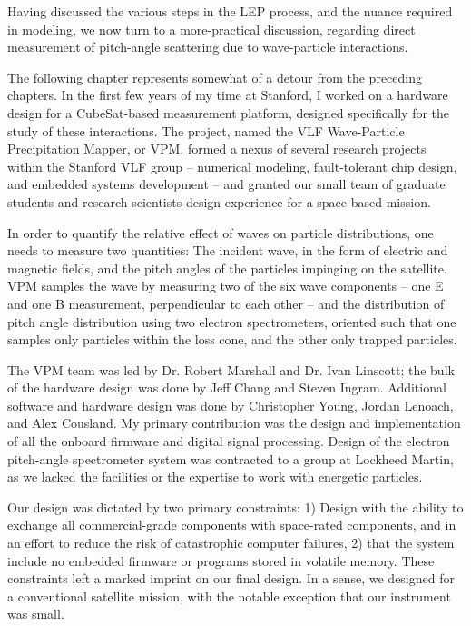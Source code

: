 Having discussed the various steps in the LEP process, and the nuance required in modeling, we now turn to a more-practical discussion, regarding direct measurement of pitch-angle scattering due to wave-particle interactions. 

The following chapter represents somewhat of a detour from the preceding chapters. In the first few years of my time at Stanford, I worked on a hardware design for a CubeSat-based measurement platform, designed specifically for the study of these interactions. The project, named the VLF Wave-Particle Precipitation Mapper, or VPM, formed a nexus of several research projects within the Stanford VLF group -- numerical modeling, fault-tolerant chip design, and embedded systems development -- and granted our small team of graduate students and research scientists design experience for a space-based mission.

In order to quantify the relative effect of waves on particle distributions, one needs to measure two quantities: The incident wave, in the form of electric and magnetic fields, and the pitch angles of the particles impinging on the satellite. VPM samples the wave by measuring two of the six wave components -- one E and one B measurement, perpendicular to each other -- and the distribution of pitch angle distribution using two electron spectrometers, oriented such that one samples only particles within the loss cone, and the other only trapped particles.

The VPM team was led by Dr. Robert Marshall and Dr. Ivan Linscott; the bulk of the hardware design was done by Jeff Chang and Steven Ingram. Additional software and hardware design was done by Christopher Young, Jordan Lenoach, and Alex Cousland. My primary contribution was the design and implementation of all the onboard firmware and digital signal processing. Design of the electron pitch-angle spectrometer system was contracted to a group at Lockheed Martin, as we lacked the facilities or the expertise to work with energetic particles.

Our design was dictated by two primary constraints: 1) Design with the ability to exchange all commercial-grade components with space-rated components, and in an effort to reduce the risk of catastrophic computer failures, 2) that the system include no embedded firmware or programs stored in volatile memory. These constraints left a marked imprint on our final design. In a sense, we designed for a conventional satellite mission, with the notable exception that our instrument was small.

